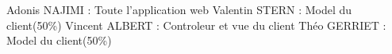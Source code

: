 Adonis NAJIMI : Toute l'application web\newline
Valentin STERN : Model du client(50\%)\newline
Vincent ALBERT : Controleur et vue du client\newline
Théo GERRIET : Model du client(50\%)\newline